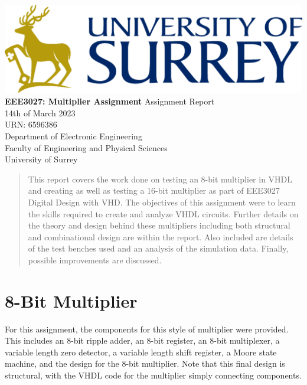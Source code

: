 \documentclass[11pt]{article}
\begin{document}
\begin{titlepage}
    \begin{center}
    \includegraphics[width=\textwidth]{Logo.png} %
    \vfill
    \Huge
    \textbf{EEE3027: Multiplier Assignment}
    \vfill
    \huge
    Assignment Report\\
    \vspace{1cm}
    \Large
    14th of March 2023\\
    URN: 6596386\\
    \vfill
    \vfill
    \Large
    Department of Electronic Engineering\\
    Faculty of Engineering and Physical Sciences\\
    University of Surrey\\
    \end{center}
\end{titlepage}

\begin{abstract}
This report covers the work done on testing an 8-bit multiplier in VHDL and creating as well as testing a 16-bit multiplier
as part of EEE3027 Digital Design with VHD.
The objectives of this assignment were to learn the skills required to create and analyze VHDL circuits. 
Further details on the theory and design behind these multipliers including both structural and combinational design are within the report. 
Also included are details of the test benches used and an analysis of the simulation data.
Finally, possible improvements are discussed.

\vspace{1cm}
\end{abstract}
\tableofcontents
\pagebreak

\section{8-Bit Multiplier}
For this assignment, the components for this style of multiplier were provided.
This includes an 8-bit ripple adder, an 8-bit register, an 8-bit multiplexer, a variable length zero detector, a variable length shift register, a Moore state machine,
and the design for the 8-bit multiplier.
Note that this final design is structural, with the VHDL code for the multiplier simply connecting components.
\end{document}

